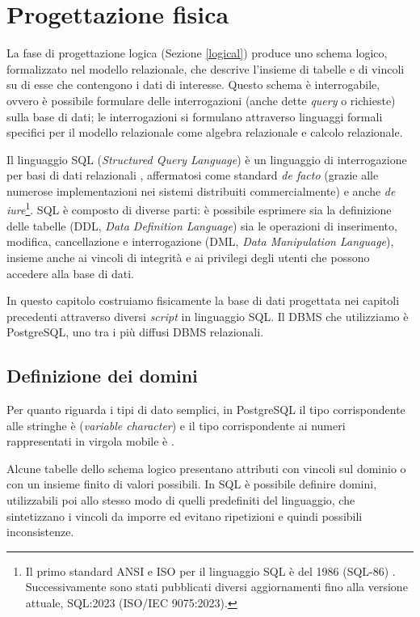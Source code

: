\chapter{Progettazione fisica}
\label{physical}

La fase di progettazione logica (Sezione \ref{logical}) produce uno schema logico, formalizzato nel modello relazionale, che descrive l'insieme di tabelle e di vincoli su di esse che contengono i dati di interesse.
Questo schema è interrogabile, ovvero è possibile formulare delle interrogazioni (anche dette \emph{query} o richieste) sulla base di dati; le interrogazioni si formulano attraverso linguaggi formali specifici per il modello relazionale come algebra relazionale e calcolo relazionale.

Il linguaggio SQL (\emph{Structured Query Language}) è un linguaggio di interrogazione per basi di dati relazionali \cite{Sil11}, affermatosi come standard \emph{de facto} (grazie alle numerose implementazioni nei sistemi distribuiti commercialmente) e anche \emph{de iure}\footnote{
Il primo standard ANSI e ISO per il linguaggio SQL è del 1986 (SQL-86) \cite{Sil11}. Successivamente sono stati pubblicati diversi aggiornamenti fino alla versione attuale, SQL:2023 (ISO/IEC 9075:2023).
}.
SQL è composto di diverse parti: è possibile esprimere sia la definizione delle tabelle (DDL, \emph{Data Definition Language}) sia le operazioni di inserimento, modifica, cancellazione e interrogazione (DML, \emph{Data Manipulation Language}), insieme anche ai vincoli di integrità e ai privilegi degli utenti che possono accedere alla base di dati.

In questo capitolo costruiamo fisicamente la base di dati progettata nei capitoli precedenti attraverso diversi \emph{script} in linguaggio SQL.
Il DBMS che utilizziamo è PostgreSQL, uno tra i più diffusi DBMS relazionali.

\section{Definizione dei domini}
\label{physicaldomains}

Per quanto riguarda i tipi di dato semplici, in PostgreSQL il tipo corrispondente alle stringhe è  (\emph{variable character}) e il tipo corrispondente ai numeri rappresentati in virgola mobile è .

Alcune tabelle dello schema logico presentano attributi con vincoli sul dominio o con un insieme finito di valori possibili.
In SQL è possibile definire domini, utilizzabili poi allo stesso modo di quelli predefiniti del linguaggio, che sintetizzano i vincoli da imporre ed evitano ripetizioni e quindi possibili inconsistenze.

